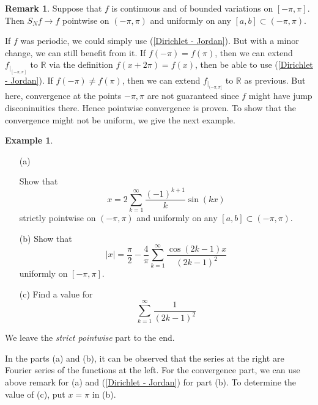 \documentclass[12pt]{amsart}
\theoremstyle{definition}
\newtheorem{example}[theorem]{Example}
\newtheorem{remark}[theorem]{Remark}
\newcommand{\RR}{{\mathbb R}} %
\begin{document}
\begin{remark}
    Suppose that $f$ is continuous and of bounded variations on $[-\pi,\pi]$. Then $S_Nf \to f$ pointwise on $(-\pi,\pi)$ and uniformly on any $[a,b] \subset (-\pi,\pi)$.
\end{remark}



If $f$ was periodic, we could simply use (\ref{Dirichlet - Jordan}).
But with a minor change, we can still benefit from it. If $f(-\pi) = f(\pi)$,
then we can extend $f_{|_{[-\pi,\pi]}}$ to $\RR$ via the definition $f(x + 2\pi) = f(x)$,
then be able to use (\ref{Dirichlet - Jordan}). If $f(-\pi) \neq f(\pi)$, then we can extend $f_{|_{(-\pi,\pi]}}$
to $\RR$ as previous. But here, convergence at the points ${-\pi,\pi}$ are not guaranteed since $f$ might have jump disconinuities there.
Hence pointwise convergence is proven. To show that the convergence might not be uniform, we give the next example.



\begin{example}
    \begin{enumerate}
        \item[(a)]\footnotemark{}

        

        
        Show that
        \[
        x = 2\sum_{k=1}^{\infty}\frac{(-1)^{k+1}}{k}\sin(kx)
        \]
        strictly pointwise on $(-\pi,\pi)$ and uniformly on any $[a,b] \subset (-\pi,\pi)$.


        \item[(b)] Show that
        \[
        |x| = \frac{\pi}{2} - \frac{4}{\pi} \sum_{k=1}^{\infty}\frac{\cos(2k-1)x}{(2k-1)^2}
        \]
        uniformly on $[-\pi,\pi]$.


        \item[(c)] Find a value for
        \[
        \sum_{k=1}^{\infty}\frac{1}{(2k-1)^2}
        \]
    \end{enumerate}
\end{example}



We leave the \emph{strict pointwise} part to the end.


In the parts (a) and (b), it can be observed that the series at the right are
Fourier series of the functions at the left. For the convergence part,
we can use above remark for (a) and (\ref{Dirichlet - Jordan}) for part (b).
To determine the value of (c), put $x=\pi$ in (b).
\end{document}
